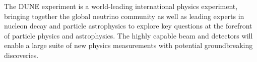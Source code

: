 The DUNE experiment is a world-leading international physics
experiment, bringing together the %
global neutrino community as well
as leading experts in nucleon decay and particle astrophysics to
explore key questions at the forefront of particle physics and
astrophysics. The highly capable beam and detectors will enable a
large suite of new physics measurements with potential groundbreaking
discoveries.










